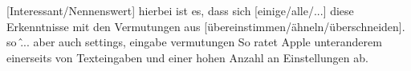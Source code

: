 [Interessant/Nennenswert] hierbei ist es, dass sich [einige/alle/...] diese Erkenntnisse mit den Vermutungen aus  [übereinstimmen/ähneln/überschneiden]. %
	so \^ ...
	aber auch settings, eingabe vermutungen
	So ratet Apple unteranderem einerseits von Texteingaben und einer hohen Anzahl an Einstellungen ab\cite{konventionen_enteringDate,konventionen_settings}. 